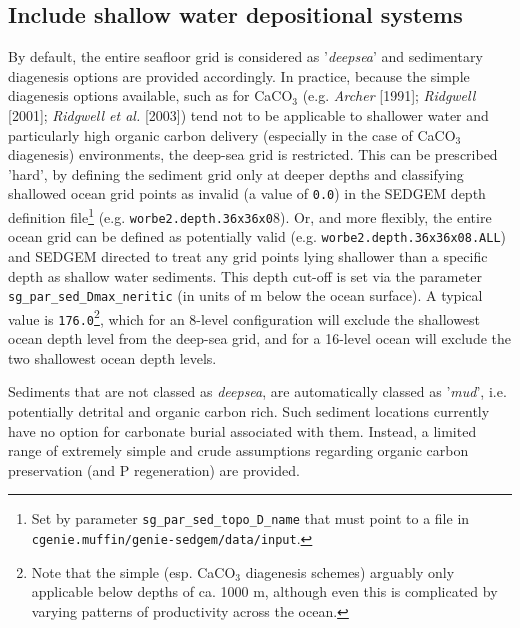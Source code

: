 \documentclass[10pt,twoside]{article}
\begin{document}

\subsection{Include shallow water depositional systems}\label{configure_reefs}

By default, the entire seafloor grid is considered as '\textit{deepsea}' and sedimentary diagenesis options are provided accordingly. In practice, because the simple diagenesis options available, such as for CaCO\(_{3}\) (e.g. \textit{Archer} [1991]; \textit{Ridgwell} [2001]; \textit{Ridgwell et al.} [2003]) tend not to be applicable to shallower water and particularly high organic carbon delivery (especially in the case of CaCO\(_{3}\) diagenesis) environments, the deep-sea grid is restricted. This can be prescribed 'hard', by defining the sediment grid only at deeper depths and classifying shallowed ocean grid points as invalid (a value of \texttt{0.0}) in the SEDGEM depth definition file\footnote{Set by parameter \texttt{sg\_par\_sed\_topo\_D\_name} that must point to a file in \texttt{cgenie.muffin/genie-sedgem/data/input}.} (e.g. \texttt{worbe2.depth.36x36x0}8).
 Or, and more flexibly, the entire ocean grid can be defined as potentially valid (e.g. \texttt{worbe2.depth.36x36x08.ALL}) and SEDGEM directed to treat any grid points lying shallower than a specific depth as shallow water sediments. This depth cut-off is set via the parameter \texttt{sg\_par\_sed\_Dmax\_neritic} (in units of m below the ocean surface). A typical value is \texttt{176.0}\footnote{Note that the simple (esp. CaCO\(_{3}\) diagenesis schemes) arguably only applicable below depths of ca. 1000 m, although even this is complicated by varying patterns of productivity across the ocean.}, which for an 8-level configuration will exclude the shallowest ocean depth level from the deep-sea grid, and for a 16-level ocean will exclude the two shallowest ocean depth levels.

Sediments that are not classed as \textit{deepsea}, are automatically classed as '\textit{mud}', i.e. potentially detrital and organic carbon rich. Such sediment locations  currently have no option for carbonate burial associated with them. Instead, a limited range of extremely simple and crude assumptions regarding organic carbon preservation (and P regeneration) are provided.
\end{document}
